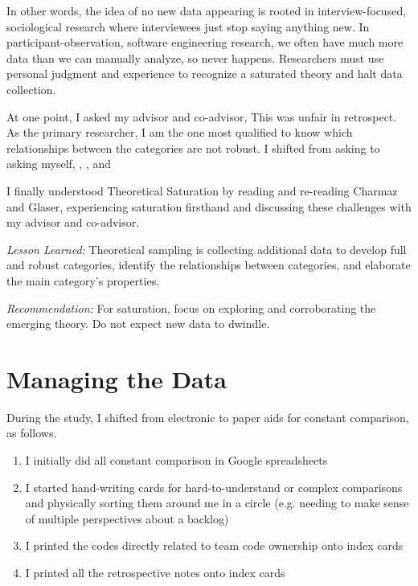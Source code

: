 In other words, the idea of no new data appearing is rooted in interview-focused, sociological research where interviewees just stop saying anything new. In participant-observation, software engineering research, we often have much more data than we can manually analyze, so  never happens. Researchers must use personal judgment and experience to recognize a saturated theory and halt data collection.   

At one point, I asked my advisor and co-advisor,  This was unfair in retrospect. As the primary researcher, I am the one most qualified to know which relationships between the categories are not robust. I shifted from asking  to asking myself, , , and 

I finally understood Theoretical Saturation by reading and re-reading Charmaz and Glaser, experiencing saturation firsthand and discussing these challenges with my advisor and co-advisor. 

\textit{Lesson Learned:} Theoretical sampling is collecting additional data to develop full and robust categories, identify the relationships between categories, and elaborate the main category's properties.

\textit{Recommendation:} For saturation, focus on exploring and corroborating the emerging theory. Do not expect new data to dwindle.  
\section{Managing the Data}
\label{ManagingTheData}
During the study, I shifted from electronic to paper aids for constant comparison, as follows. 
\begin{enumerate}
  \item I initially did all constant comparison in Google spreadsheets
  \item I started hand-writing cards for hard-to-understand or complex comparisons and physically sorting them around me in a circle (e.g. needing to make sense of multiple perspectives about a backlog)
  \item I printed the codes directly related to team code ownership onto index cards
  \item I printed all the retrospective notes onto index cards
\end{enumerate}

